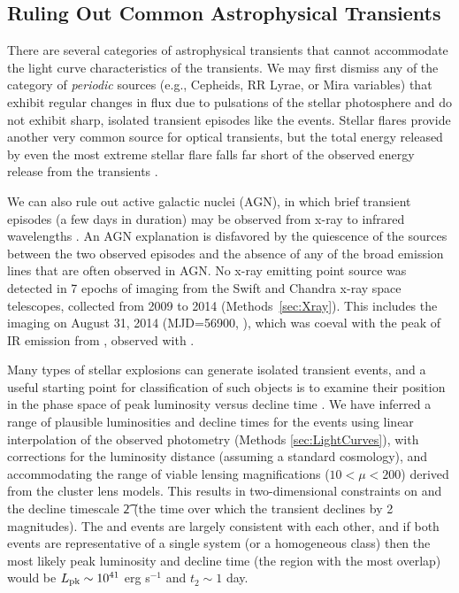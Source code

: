 \subsection{Ruling Out Common Astrophysical Transients}

There are several categories of astrophysical transients that cannot
accommodate the light curve characteristics of the \spock transients.
We may first dismiss any of the category of {\it periodic} sources
(e.g., Cepheids, RR Lyrae, or Mira variables) that exhibit regular
changes in flux due to pulsations of the stellar photosphere and do
not exhibit sharp, isolated transient episodes like the \spock
events. Stellar flares provide another very common source for optical
transients, but the total energy released by even the most
extreme stellar flare falls far short of the observed energy release
from the \spock transients \citep{Balona:2012,Karoff:2016} .

We can also rule out active galactic nuclei (AGN), in which brief
transient episodes (a few days in duration) may be observed from x-ray
to infrared wavelengths \citep[e.g.][]{Gaskell:2003}. An AGN
explanation is disfavored by the quiescence of the \spock sources
between the two observed episodes and the absence of any of the broad
emission lines that are often observed in AGN.  No x-ray emitting
point source was detected in 7 epochs of imaging from the Swift and
Chandra x-ray space telescopes, collected from 2009 to 2014
(Methods~\ref{sec:Xray}).  This includes the \Chandra imaging on
August 31, 2014 (MJD=56900, ), which was coeval with the peak of IR emission from
\spocktwo, observed with \HST.

Many types of stellar explosions can generate isolated
transient events, and a useful starting point for classification of
such objects is to examine their position in the phase
space of peak luminosity versus decline time \citep[see,
  e.g.,][]{Kulkarni:2007}. We have inferred a range of plausible
luminosities and decline times for the \spock events using linear
interpolation of the observed photometry (Methods
\ref{sec:LightCurves}), with corrections for the luminosity distance
(assuming a standard \LCDM cosmology), and accommodating the range of
viable lensing magnifications ($10<\mu<200$) derived from the cluster
lens models. This results in two-dimensional constraints on \Lpk and
the decline timescale \t2 (the time over which the transient declines
by 2 magnitudes). The \spockone and \spocktwo events are largely
consistent with each other, and if both events are representative of a
single system (or a homogeneous class) then the most likely peak
luminosity and decline time (the region with the most overlap) would
be $L_{\rm pk}\sim10^{41}$ erg s$^{-1}$ and $t_2\sim1$ day.

